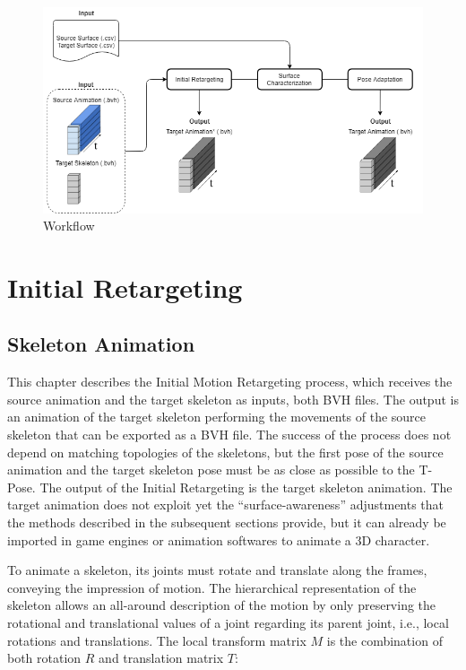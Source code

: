 \documentclass{vgtc}
\makeatletter
\def\maxwidth{\ifdim\Gin@nat@width>\linewidth\linewidth
    \else\Gin@nat@width\fi}
\let\Oldincludegraphics\includegraphics
\renewcommand{\includegraphics}[1]{\Oldincludegraphics[width=.8\maxwidth]{#1}}
\makeatother
\begin{document}
\begin{figure}
\centering
\includegraphics{../figures/Workflow3.png}
\caption{Workflow}
\end{figure}

    \hypertarget{initial-retargeting}{%
\section{Initial Retargeting}\label{initial-retargeting}}

\hypertarget{skeleton-animation}{%
\subsection{Skeleton Animation}\label{skeleton-animation}}

This chapter describes the Initial Motion Retargeting process, which
receives the source animation and the target skeleton as inputs, both
BVH files. The output is an animation of the target skeleton performing
the movements of the source skeleton that can be exported as a BVH file.
The success of the process does not depend on matching topologies of the
skeletons, but the first pose of the source animation and the target
skeleton pose must be as close as possible to the T-Pose. The output of
the Initial Retargeting is the target skeleton animation. The target
animation does not exploit yet the ``surface-awareness'' adjustments
that the methods described in the subsequent sections provide, but it
can already be imported in game engines or animation softwares to
animate a 3D character.

To animate a skeleton, its joints must rotate and translate along the
frames, conveying the impression of motion. The hierarchical
representation of the skeleton allows an all-around description of the
motion by only preserving the rotational and translational values of a
joint regarding its parent joint, i.e., local rotations and
translations. The local transform matrix \(M\) is the combination of
both rotation \(R\) and translation matrix \(T\):
\end{document}
